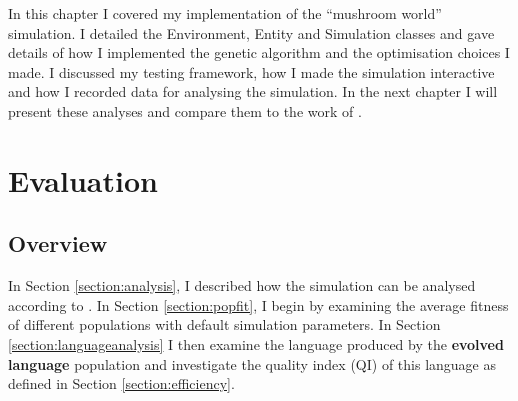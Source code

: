 \documentclass[12pt,a4paper,twoside,openright]{report}
\begin{document}
In this chapter I covered my implementation of the ``mushroom world'' simulation. I detailed the Environment, Entity and Simulation classes and gave details of how I implemented the genetic algorithm and the optimisation choices I made. I discussed my testing framework, how I made the simulation interactive and how I recorded data for analysing the simulation. In the next chapter I will present these analyses and compare them to the work of \citet{Cangelosi1998}.


\chapter{Evaluation}





\section{Overview}


In Section \ref{section:analysis}, I described how the simulation can be analysed according to \citet{Cangelosi1998}. In Section \ref{section:popfit}, I begin by examining the average fitness of different populations with default simulation parameters. In Section \ref{section:languageanalysis} I then examine the language produced by the {\bf evolved language} population and investigate the quality index (QI) of this language as defined in Section \ref{section:efficiency}. 
\end{document}
